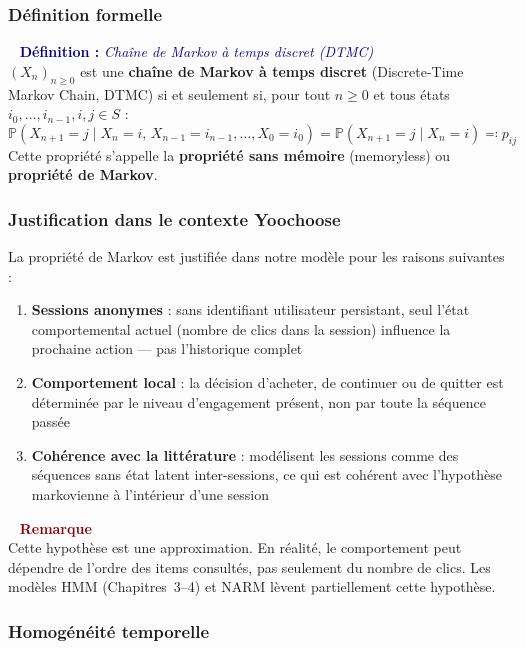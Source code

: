 \documentclass[11pt,a4paper]{article}
\newenvironment{defbox}[1]{%
  \vspace{3pt}\begin{framed}
  \noindent{\color{NavyBlue}\rule{0.3cm}{3pt}}~%
  \textcolor{DarkBlue}{\textbf{Définition :} \textit{#1}}\\[3pt]}
  {\end{framed}\vspace{3pt}}
\newenvironment{warnbox}{%
  \vspace{3pt}\begin{framed}
  \noindent{\color{DarkRed}\rule{0.3cm}{3pt}}~%
  \textcolor{DarkRed}{\textbf{Remarque}}\\[3pt]}
  {\end{framed}\vspace{3pt}}
\newcommand{\Prob}{\mathbb{P}}
\begin{document}
\subsubsection{Définition formelle}

\begin{defbox}{Chaîne de Markov à temps discret (DTMC)}
$(X_n)_{n\geq 0}$ est une \textbf{chaîne de Markov à temps discret}
(Discrete-Time Markov Chain, DTMC) si et seulement si, pour tout
$n \geq 0$ et tous états $i_0,\ldots,i_{n-1}, i, j \in S$ :
\[
  \Prob(X_{n+1}=j \mid X_n=i,\,X_{n-1}=i_{n-1},\ldots,X_0=i_0)
  = \Prob(X_{n+1}=j \mid X_n=i)
  \eqqcolon p_{ij}
\]
Cette propriété s'appelle la \textbf{propriété sans mémoire} (memoryless)
ou \textbf{propriété de Markov}.
\end{defbox}

\subsubsection{Justification dans le contexte Yoochoose}

La propriété de Markov est justifiée dans notre modèle pour les raisons suivantes :

\begin{enumerate}[leftmargin=1.5em,itemsep=3pt]
  \item \textbf{Sessions anonymes} : sans identifiant utilisateur persistant,
        seul l'état comportemental actuel (nombre de clics dans la session)
        influence la prochaine action --- pas l'historique complet
  \item \textbf{Comportement local} : la décision d'acheter, de continuer
        ou de quitter est déterminée par le niveau d'engagement présent,
        non par toute la séquence passée
  \item \textbf{Cohérence avec la littérature} : \citet{hidasi2016}
        modélisent les sessions comme des séquences sans état latent
        inter-sessions, ce qui est cohérent avec l'hypothèse markovienne
        à l'intérieur d'une session
\end{enumerate}

\begin{warnbox}
Cette hypothèse est une approximation. En réalité, le comportement
peut dépendre de l'ordre des items consultés, pas seulement du nombre
de clics. Les modèles HMM (Chapitres~3--4) et NARM \citep{li2017narm}
lèvent partiellement cette hypothèse.
\end{warnbox}

\subsubsection{Homogénéité temporelle}
\end{document}
